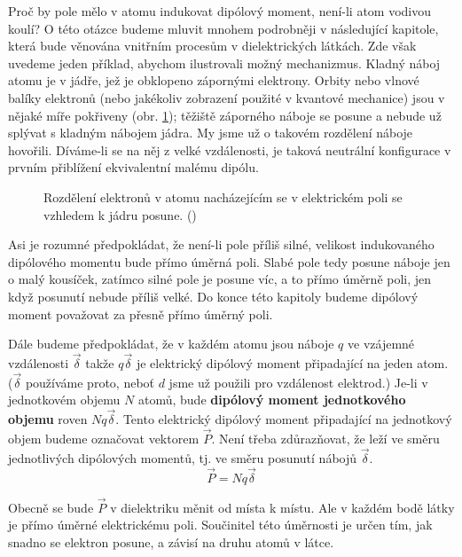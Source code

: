     Proč by pole mělo v atomu indukovat dipólový moment, není-li atom vodivou koulí? O této otázce
    budeme mluvit mnohem podrobněji v následující kapitole, která bude věnována vnitřním procesům v
    dielektrických látkách. Zde však uvedeme jeden příklad, abychom ilustrovali možný mechanizmus.
    Kladný náboj atomu je v jádře, jež je obklopeno zápornými elektrony. Orbity nebo vlnové balíky
    elektronů (nebo jakékoliv zobrazení použité v kvantové mechanice) jsou v nějaké míře pokřiveny
    (obr. \ref{fyz:fig0708}); těžiště záporného náboje se posune a nebude už splývat s kladným
    nábojem jádra. My jsme už o takovém rozdělení náboje hovořili. Díváme-li se na něj z velké
    vzdálenosti, je taková neutrální konfigurace v prvním přiblížení ekvivalentní malému dipólu.

    \begin{figure}[ht!]
      \centering
      \caption{Rozdělení elektronů v atomu nacházejícím se v elektrickém poli se vzhledem k jádru
              posune. (\cite[s.~177]{Feynman02})}
      \label{fyz:fig0708}
    \end{figure}

    Asi je rozumné předpokládat, že není-li pole příliš silné, velikost indukovaného dipólového
    momentu bude přímo úměrná poli. Slabé pole tedy posune náboje jen o malý kousíček, zatímco silné
    pole je posune víc, a to přímo úměrně poli, jen když posunutí nebude příliš velké. Do konce této
    kapitoly budeme dipólový moment považovat za přesně přímo úměrný poli.

    Dále budeme předpokládat, že v každém atomu jsou náboje \(q\) ve vzájemné vzdálenosti
    \(\vec{δ}\) takže \(q\vec{δ}\) je elektrický dipólový moment připadající na jeden atom.
    (\(\vec{δ}\) používáme proto, neboť \(d\) jsme už použili pro vzdálenost elektrod.) Je-li v
    jednotkovém objemu \(N\) atomů, bude \textbf{dipólový moment jednotkového objemu} roven
    \(Nq\vec{δ}\). Tento elektrický dipólový moment připadající na jednotkový objem budeme označovat
    vektorem \(\vec{P}\). Není třeba zdůrazňovat, že leží ve směru jednotlivých dipólových momentů,
    tj. ve směru posunutí nábojů \(\vec{δ}\).
    \begin{equation}\label{fyz:eq910}
      \vec{P} = Nq\vec{δ}
    \end{equation}

    Obecně se bude \(\vec{P}\) v dielektriku měnit od místa k místu. Ale v každém bodě látky je
    přímo úměrné elektrickému poli. Součinitel této úměrnosti je určen tím, jak snadno se elektron
    posune, a závisí na druhu atomů v látce.
    
